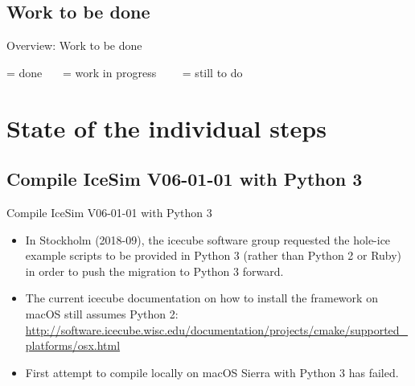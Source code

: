 \subsection{Work to be done}
\begin{frame}{Overview: Work to be done}


  \tableofcontents[sectionstyle=hide,subsectionstyle=show,sections=2-]

  \bigskip \bigskip \small
  \done = done \ \ \ \inprogress = work in progress \ \ \ \tobedone\ = still to do
\end{frame}

\section{State of the individual steps}
\subsection{\done Compile IceSim V06-01-01 with Python 3}
\begin{frame}{\done Compile IceSim V06-01-01 with Python 3}
  \begin{itemize}
    \item In Stockholm (2018-09), the icecube software group requested the hole-ice example scripts to be provided in Python 3 (rather than Python 2 or Ruby) in order to push the migration to Python 3 forward.
    \item The current icecube documentation on how to install the framework on macOS still assumes Python 2: \url{http://software.icecube.wisc.edu/documentation/projects/cmake/supported_platforms/osx.html}
    \item First attempt to compile locally on macOS Sierra with Python 3 has failed.
  \end{itemize}
\end{frame}

